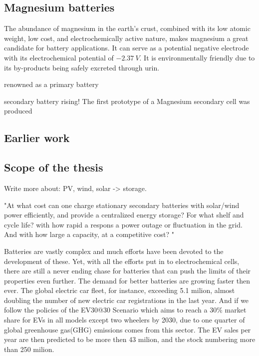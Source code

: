 \subsection{Magnesium batteries}
The abundance of magnesium in the earth's crust, combined with its low atomic weight, low cost, and electrochemically active nature, makes magnesium a great candidate for battery applications. It can serve as a potential negative electrode with its electrochemical potential of $\SI{-2.37}{V}$. It is environmentally friendly due to its by-products being safely excreted through urin.  

renowned as a primary battery

secondary battery rising!
The first prototype of a Magnesium secondary cell was produced 


\subsection{Earlier work}



\subsection{Scope of the thesis}
Write more about: PV, wind, solar -> storage.

"At what cost can one charge stationary secondary batteries with solar/wind power efficiently, and provide a centralized energy storage? For what shelf and cycle life? with how rapid a respons  a power outage or fluctuation in the grid. And with how large a capacity, at a competitive cost? " 


Batteries are vastly complex and much efforts have been devoted to the development of these. Yet, with all the efforts put in to electrochemical cells, there are still a never ending chase for batteries that can push the limits of their properties even further. The demand for better batteries are growing faster then ever. The global electric car fleet, for instance, exceeding 5.1 milion\cite{international2018global}, almost doubling the number of new electric car registrations in the last year. And if we follow the policies of the EV30@30 Scenario which aims to reach a $30\%$ market share for EVs in all models except two wheelers by 2030, due to one quarter of global greenhouse gas(GHG) emissions comes from this sector. The EV sales per year are then predicted to be more then 43 milion, and the stock numbering more than 250 milion.  

